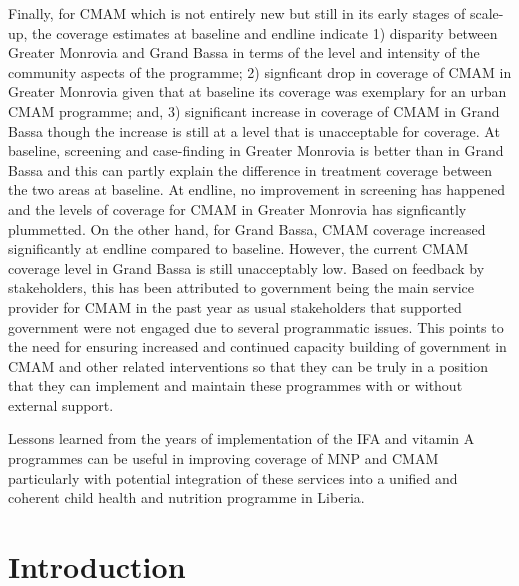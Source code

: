 \documentclass[12pt,a4paper]{article}
\begin{document}
Finally, for CMAM which is not entirely new but still in its early stages of scale-up, the coverage estimates at baseline and endline indicate 1) disparity between Greater Monrovia and Grand Bassa in terms of the level and intensity of the community aspects of the programme; 2) signficant drop in coverage of CMAM in Greater Monrovia given that at baseline its coverage was exemplary for an urban CMAM programme; and, 3) significant increase in coverage of CMAM in Grand Bassa though the increase is still at a level that is unacceptable for coverage. At baseline, screening and case-finding in Greater Monrovia is better than in Grand Bassa and this can partly explain the difference in treatment coverage between the two areas at baseline. At endline, no improvement in screening has happened and the levels of coverage for CMAM in Greater Monrovia has signficantly plummetted. On the other hand, for Grand Bassa, CMAM coverage increased significantly at endline compared to baseline. However, the current CMAM coverage level in Grand Bassa is still unacceptably low. Based on feedback by stakeholders, this has been attributed to government being the main service provider for CMAM in the past year as usual stakeholders that supported government were not engaged due to several programmatic issues. This points to the need for ensuring increased and continued capacity building of government in CMAM and other related interventions so that they can be truly in a position that they can implement and maintain these programmes with or without external support.

Lessons learned from the years of implementation of the IFA and vitamin A programmes can be useful in improving coverage of MNP and CMAM particularly with potential integration of these services into a unified and coherent child health and nutrition programme in Liberia.

\newpage

\hypertarget{intro}{%
\section{Introduction}\label{intro}}
\end{document}
